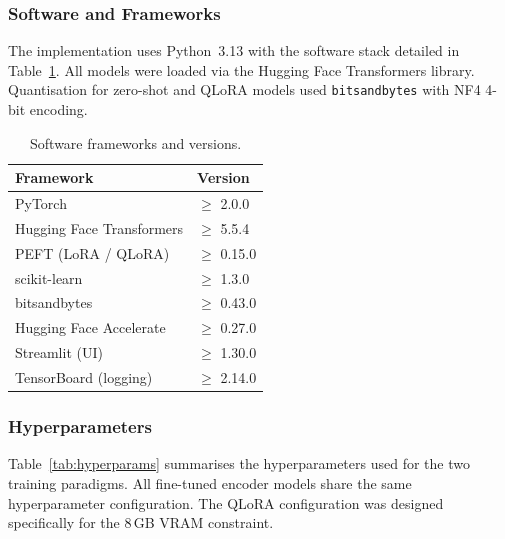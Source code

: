 \documentclass[conference]{IEEEtran}
\begin{document}
\subsubsection{Software and Frameworks}
The implementation uses Python~3.13 with the software stack detailed in
Table~\ref{tab:software}.  All models were loaded via the Hugging Face
Transformers library.  Quantisation for zero-shot and QLoRA models used
\texttt{bitsandbytes} with NF4 4-bit encoding.

\begin{table}[t]
\centering
\caption{Software frameworks and versions.}
\label{tab:software}
\begin{tabular}{ll}
\hline
\textbf{Framework}        & \textbf{Version} \\
\hline
PyTorch                    & $\geq$ 2.0.0 \\
Hugging Face Transformers  & $\geq$ 5.5.4 \\
PEFT (LoRA / QLoRA)        & $\geq$ 0.15.0 \\
scikit-learn               & $\geq$ 1.3.0 \\
bitsandbytes               & $\geq$ 0.43.0 \\
Hugging Face Accelerate    & $\geq$ 0.27.0 \\
Streamlit (UI)             & $\geq$ 1.30.0 \\
TensorBoard (logging)      & $\geq$ 2.14.0 \\
\hline
\end{tabular}
\end{table}

\subsubsection{Hyperparameters}
Table~\ref{tab:hyperparams} summarises the hyperparameters used for the
two training paradigms.  All fine-tuned encoder models share the same
hyperparameter configuration.  The QLoRA configuration was designed
specifically for the 8\,GB VRAM constraint.
\end{document}
